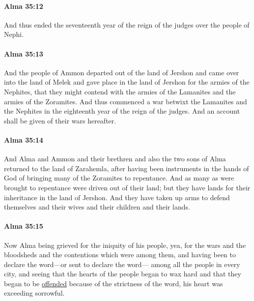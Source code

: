 		\paragraph{Alma 35:12} %
			\label{ALMA-35-12}

			And thus ended the seventeenth year
			of the reign of the judges over the people of Nephi.

		\paragraph{Alma 35:13} %
			\label{ALMA-35-13}

			And the people of Ammon departed out of the land of Jershon
			and came over into the land of Melek
			and gave place in the land of Jershon for the armies of the Nephites,
			that they might contend with the armies of the Lamanites
			and the armies of the Zoramites.
			And thus commenced a war betwixt the Lamanites and the Nephites
			in the eighteenth year of the reign of the judges.
			And an account shall be given of their wars hereafter.

		\paragraph{Alma 35:14} %
			\label{ALMA-35-14}

			And Alma and Ammon and their brethren and also the two sons of Alma
			returned to the land of Zarahemla,
			after having been instruments in the hands of God
			of bringing many of the Zoramites to repentance.
			And as many as were brought to repentance were driven out of their land;
			but they have lands for their inheritance in the land of Jershon.
			And they have taken up arms to defend themselves
			and their wives and their children and their lands.

		\paragraph{Alma 35:15} %
			\label{ALMA-35-15}

			Now Alma being grieved for the iniquity of his people,
			yea, for the wars and the bloodsheds and the contentions which were among them,
			and having been to declare the word---or sent to declare the word---
			among all the people in every city,
			and seeing that the hearts of the people began to wax hard
			and that they began to be \hyperref[OFFENSE]{offended} because of the strictness of the word,
			his heart was exceeding sorrowful.

